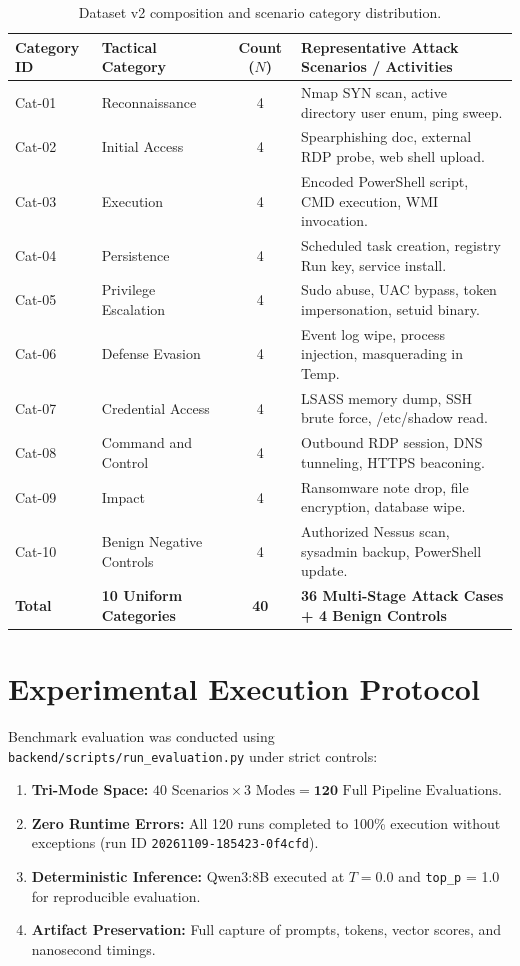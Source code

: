 \begin{table}[!htbp]
\centering
\caption{Dataset v2 composition and scenario category distribution.}
\label{tab:dataset_distribution}
\small
\begin{tabularx}{\textwidth}{@{}l l c X@{}}
\toprule
\textbf{Category ID} & \textbf{Tactical Category} & \textbf{Count ($N$)} & \textbf{Representative Attack Scenarios / Activities} \\
\midrule
Cat-01 & Reconnaissance & 4 & Nmap SYN scan, active directory user enum, ping sweep. \\
Cat-02 & Initial Access & 4 & Spearphishing doc, external RDP probe, web shell upload. \\
Cat-03 & Execution & 4 & Encoded PowerShell script, CMD execution, WMI invocation. \\
Cat-04 & Persistence & 4 & Scheduled task creation, registry Run key, service install. \\
Cat-05 & Privilege Escalation & 4 & Sudo abuse, UAC bypass, token impersonation, setuid binary. \\
Cat-06 & Defense Evasion & 4 & Event log wipe, process injection, masquerading in Temp. \\
Cat-07 & Credential Access & 4 & LSASS memory dump, SSH brute force, /etc/shadow read. \\
Cat-08 & Command and Control & 4 & Outbound RDP session, DNS tunneling, HTTPS beaconing. \\
Cat-09 & Impact & 4 & Ransomware note drop, file encryption, database wipe. \\
Cat-10 & Benign Negative Controls & 4 & Authorized Nessus scan, sysadmin backup, PowerShell update. \\
\midrule
\textbf{Total} & \textbf{10 Uniform Categories} & \textbf{40} & \textbf{36 Multi-Stage Attack Cases + 4 Benign Controls} \\
\bottomrule
\end{tabularx}
\end{table}

\section{Experimental Execution Protocol}
\label{sec:experimental_protocol}
Benchmark evaluation was conducted using \texttt{backend/scripts/run\_evaluation.py} under strict controls:
\begin{enumerate}
    \item \textbf{Tri-Mode Space:} $40 \text{ Scenarios} \times 3 \text{ Modes} = \mathbf{120} \text{ Full Pipeline Evaluations}$.
    \item \textbf{Zero Runtime Errors:} All 120 runs completed to 100\% execution without exceptions (run ID \texttt{20261109-185423-0f4cfd}).
    \item \textbf{Deterministic Inference:} Qwen3:8B executed at $T = 0.0$ and \texttt{top\_p} = 1.0 for reproducible evaluation.
    \item \textbf{Artifact Preservation:} Full capture of prompts, tokens, vector scores, and nanosecond timings.
\end{enumerate}

